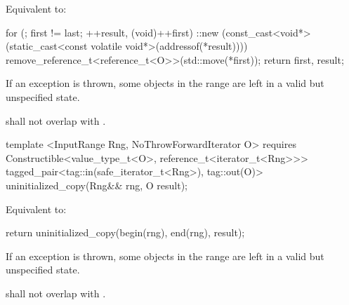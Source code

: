 {\pnum
\effects Equivalent to:
\begin{codeblock}
   for (; first != last; ++result, (void)++first) {
     ::new (const_cast<void*>(static_cast<const volatile void*>(addressof(*result))))
       remove_reference_t<reference_t<O>>(std::move(*first));
   }
   return {first, result};
\end{codeblock}

\pnum
\remarks If an exception is thrown, some objects in the range  are left in a
valid but unspecified state.

\pnum
\requires {} shall not overlap with
.


\begin{codeblock}
template <InputRange Rng, NoThrowForwardIterator O>
   requires
Constructible<value_type_t<O>, reference_t<iterator_t<Rng>>>
   tagged_pair<tag::in(safe_iterator_t<Rng>), tag::out(O)>
uninitialized_copy(Rng&& rng, O result);
\end{codeblock}

\pnum
\effects Equivalent to:
\begin{codeblock}
   return uninitialized_copy(begin(rng), end(rng), result);
\end{codeblock}

\pnum
\remarks If an exception is thrown, some objects in the range  are left
in a valid but unspecified state.

\pnum
\requires {} shall not overlap with
.
} %
